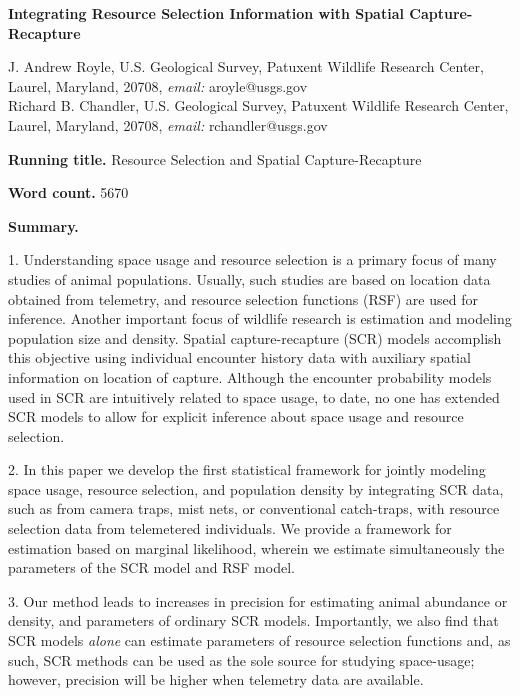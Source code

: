 \documentclass[12pt]{article}
\begin{document}
\begin{center}
\Large \textbf{
Integrating
Resource Selection Information with Spatial Capture-Recapture
}
\end{center}
%


\noindent J. Andrew Royle, U.S. Geological Survey, Patuxent
Wildlife Research Center, Laurel, Maryland, 20708,
\emph{email:} aroyle@usgs.gov \\

\noindent Richard B. Chandler,  U.S. Geological Survey, Patuxent
Wildlife Research Center, Laurel, Maryland, 20708,
\emph{email:} rchandler@usgs.gov \\

\vspace{.2in}

{\bf Running title.} Resource Selection and Spatial Capture-Recapture

\vspace{.2in}

{\bf Word count.} 5670

\vspace{.2in}

{\bf Summary.}

1. 
Understanding space usage and resource selection is a primary focus of
many studies of animal populations. Usually, such studies are based on
location data obtained from telemetry,
and resource selection functions (RSF) are used for inference.
Another important focus of wildlife research is estimation and
modeling population size and density.
Spatial capture-recapture (SCR) models accomplish this objective
using individual encounter history data with auxiliary spatial information
on location of capture. Although the encounter probability models used in SCR
are intuitively related to space usage, to date, no one has extended
SCR models to allow for explicit inference about
space usage and resource selection. 

2. In this paper we develop the first statistical framework for
jointly modeling space usage, resource selection, and population
density by integrating SCR data, such as from camera traps, mist nets, or
conventional catch-traps, with resource selection data from telemetered individuals.
We provide a framework for estimation based on marginal
likelihood, wherein we estimate simultaneously the parameters of the
SCR model and RSF model.  

3. 
Our method leads to increases in precision
for estimating animal abundance or density, and parameters of ordinary
SCR models.  Importantly, we also find that SCR models {\it alone} can
estimate parameters of resource selection functions and, as such, SCR
methods can be used as the sole source for studying space-usage;
however, precision will be higher when telemetry data are available.
\end{document}
